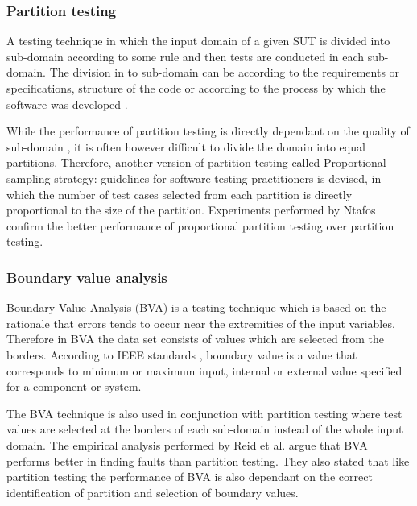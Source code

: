 {\subsubsection{Partition testing}
A testing technique in which the input domain of a given SUT is divided into sub-domain according to some rule and then tests are conducted in each sub-domain. The division in to sub-domain can be according to the requirements or specifications, structure of the code or according to the process by which the software was developed \cite{hamlet1990}. 

While the performance of partition testing is directly dependant on the quality of sub-domain \cite{weyuker1991analyzing}, it is often however difficult to divide the domain into equal partitions. Therefore, another version of partition testing called Proportional sampling strategy: guidelines for software testing practitioners \cite{Chan1996} is devised, in which the number of test cases selected from each partition is directly proportional to the size of the partition. Experiments performed by Ntafos \cite{ntafos1998random} confirm the better performance of proportional partition testing over partition testing.


\subsubsection{Boundary value analysis}
Boundary Value Analysis (BVA) is a testing technique which is based on the rationale that errors tends to occur near the extremities of the input variables. Therefore in BVA the data set consists of values which are selected from the borders. According to IEEE standards \cite{radatz1990ieee}, boundary value is a value that corresponds to minimum or maximum input, internal or external value specified for a component or system. 

The BVA technique is also used in conjunction with partition testing where test values are selected at the borders of each sub-domain instead of the whole input domain. The empirical analysis performed by Reid et al. \cite{reid1997empirical} argue that BVA performs better in finding faults than partition testing. They also stated that like partition testing the performance of BVA is also dependant on the correct identification of partition and selection of boundary values.

}
